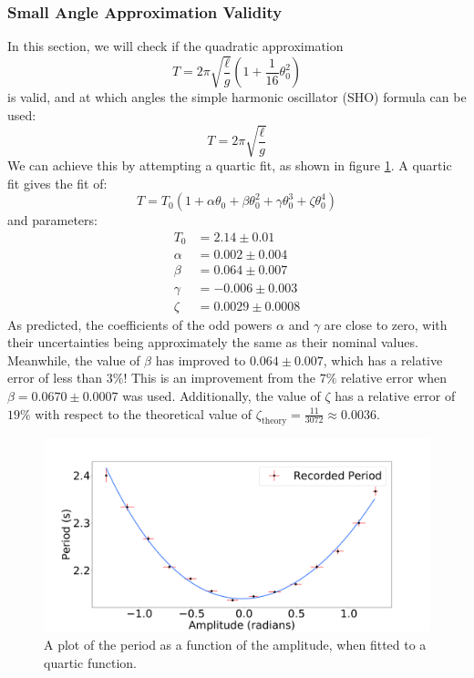 \documentclass[%
 reprint,
 amsmath,amssymb
 aps,
]{revtex4-2}
\begin{document}
\subsubsection{Small Angle Approximation Validity}
In this section, we will check if the quadratic approximation
\begin{equation}
    T = 2\pi\sqrt{\frac{\ell}{g}}\left(1+\frac{1}{16}\theta_0^2\right)
    \label{eq:}
\end{equation}
is valid, and at which angles the simple harmonic oscillator (SHO) formula can be used:
\begin{equation}
    T = 2\pi\sqrt{\frac{\ell}{g}}
    \label{eq:}
\end{equation}
We can achieve this by attempting a quartic fit, as shown in figure \ref{fig:period-vs-amplitude-quartic}. A quartic fit gives the fit of:
\begin{equation}
    T = T_0\left(1+\alpha\theta_0+\beta\theta_0^2+\gamma \theta_0^3+\zeta \theta_0^4\right)
    \label{eq:}
\end{equation}
and parameters:
\begin{align}
    T_0 &= 2.14 \pm 0.01 \\ 
    \alpha &= 0.002 \pm 0.004 \\ 
    \beta &= 0.064 \pm 0.007 \\ 
    \gamma &= -0.006 \pm 0.003 \\ 
    \zeta &= 0.0029 \pm 0.0008
    \label{eq:}
\end{align}
As predicted, the coefficients of the odd powers $\alpha$ and $\gamma$ are close to zero, with their uncertainties being approximately the same as their nominal values. Meanwhile, the value of $\beta$ has improved to $0.064\pm 0.007$, which has a relative error of less than $3\%$! This is an improvement from the $7\%$ relative error when $\beta=0.0670 \pm 0.0007$ was used. Additionally, the value of $\zeta$ has a relative error of $19\%$ with respect to the theoretical value of $\zeta_\text{theory}=\frac{11}{3072}\approx 0.0036$.
\begin{figure}[!h]
    \includegraphics[width=\linewidth]{Figures/period-vs-amplitude-quartic.png}

    \caption{A plot of the period as a function of the amplitude, when fitted to a quartic function.}
    \label{fig:period-vs-amplitude-quartic}
\end{figure}
\end{document}
